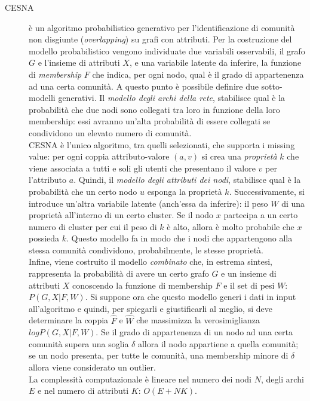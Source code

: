 \begin{description}
\item[CESNA] \`e un algoritmo probabilistico generativo per l'identificazione di comunit\`a non disgiunte (\textit{overlapping}) su grafi con attributi. Per la costruzione del modello probabilistico vengono individuate due variabili osservabili, il grafo $ G $ e l'insieme di attributi $ X $, e una variabile latente da inferire, la funzione di \textit{membership} $ F $ che indica, per ogni nodo, qual \`e il grado di appartenenza ad una certa comunit\`a. A questo punto \`e possibile definire due sotto-modelli generativi. Il \textit{modello degli archi della rete}, stabilisce qual \`e la probabilit\`a che due nodi sono collegati tra loro in funzione della loro membership: essi avranno un'alta probabilit\`a di essere collegati se condividono un elevato numero di comunit\`a.\\
CESNA \`e l'unico algoritmo, tra quelli selezionati, che supporta i missing value: per ogni coppia attributo-valore $ (a, v) $ si crea una \textit{propriet\`a} $ k $ che viene associata a tutti e soli gli utenti che presentano il valore $ v $ per l'attributo $ a $. Quindi, il \textit{modello degli attributi dei nodi}, stabilisce qual \`e la probabilit\`a che un certo nodo $ u $  esponga la propriet\`a $ k $. Successivamente, si introduce un'altra variabile latente (anch'essa da inferire): il peso $ W $ di una propriet\`a all'interno di un certo cluster. Se il nodo $ x $ partecipa a un certo numero di cluster per cui il peso di $ k $ \`e alto, allora \`e molto probabile che $ x $ possieda $ k $. Questo modello fa in modo che i nodi che appartengono alla stessa comunit\`a condividono, probabilmente, le stesse propriet\`a.\\
Infine, viene costruito il modello \textit{combinato} che, in estrema sintesi, rappresenta la probabilit\`a di avere un certo grafo $ G $ e un insieme di attributi $ X $ conoscendo la funzione di membership $ F $ e il set di pesi $ W $: $ P(G, X | F, W) $. Si suppone ora che questo modello generi i dati in input all'algoritmo e quindi, per spiegarli e giustificarli al meglio, si deve determinare la coppia $ \hat{F} $ e $ \hat{W} $ che massimizza la verosimiglianza $ log P(G,X | F,W) $. Se il grado di appartenenza di un nodo ad una certa comunit\`a supera una soglia $ \delta $ allora il nodo appartiene a quella comunit\`a; se un nodo presenta, per tutte le comunit\`a, una membership minore di $ \delta $ allora viene considerato un outlier.\\
La complessit\`a computazionale \`e lineare nel numero dei nodi $N$, degli archi $E$ e nel numero di attributi $K$: $ O (E + NK) $.


\end{description}
